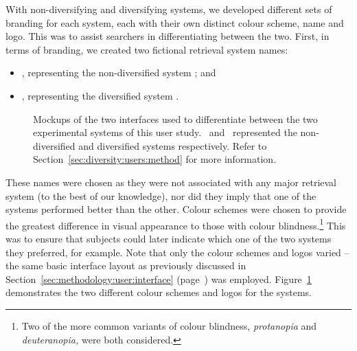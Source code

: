 With non-diversifying and diversifying systems, we developed different sets of branding for each system, each with their own distinct colour scheme, name and logo. This was to assist searchers in differentiating between the two. First, in terms of branding, we created two fictional retrieval system names:

\begin{itemize}
    \item{\hula, representing the non-diversified system ; and}
    \item{\yoyo, representing the diversified system .}
\end{itemize}

\begin{figure}[t!]
    \centering
    \caption[Diversity user study interface mockups]{Mockups of the two interfaces used to differentiate between the two experimental systems of this user study. \hula~and \yoyo~represented the non-diversified and diversified systems respectively. Refer to Section~\ref{sec:diversity:users:method} for more information.}
    \label{fig:interface_headers}
\end{figure}

These names were chosen as they were not associated with any major retrieval system (to the best of our knowledge), nor did they imply that one of the systems performed better than the other. Colour schemes were chosen to provide the greatest difference in visual appearance to those with colour blindness.\footnote{Two of the more common variants of colour blindness, \emph{protanopia} and \emph{deuteranopia,} were both considered.} This was to ensure that subjects could later indicate which one of the two systems they preferred, for example. Note that only the colour schemes and logos varied -- the same basic interface layout as previously discussed in Section~\ref{sec:methodology:user:interface} (page~\pageref{sec:methodology:user:interface}) was employed. Figure~\ref{fig:interface_headers} demonstrates the two different colour schemes and logos for the systems.

